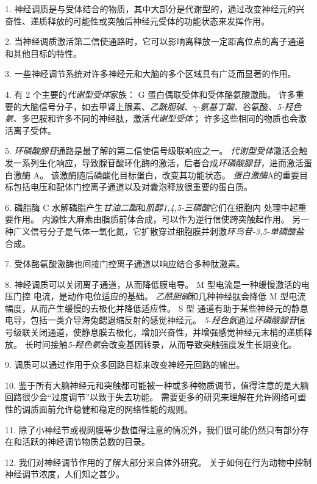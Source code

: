 1. 神经调质是与受体结合的物质，其中大部分是代谢型的，通过改变神经元的兴奋性、递质释放的可能性或突触后神经元受体的功能状态来发挥作用。


2. 当神经调质激活第二信使通路时，它可以影响离释放一定距离位点的离子通道和其他目标的特性。


3. 一些神经调节系统对许多神经元和大脑的多个区域具有广泛而显著的作用。


4. 有 2 个主要的\textit{代谢型受体}家族：
G 蛋白偶联受体和受体酪氨酸激酶。 
许多重要的大脑信号分子，如去甲肾上腺素、\textit{乙酰胆碱}、\textit{$\gamma$-氨基丁酸}、谷氨酸、\textit{5-羟色氨}、多巴胺和许多不同的神经肽，激活\textit{代谢型受体}；
许多这些相同的物质也会激活离子受体。 


5. \textit{环磷酸腺苷}通路是最了解的第二信使信号级联响应之一。
\textit{代谢型受体}激活会触发一系列生化响应，导致腺苷酸环化酶的激活，后者合成\textit{环磷酸腺苷}，进而激活蛋白激酶 A。
该激酶随后磷酸化目标蛋白，改变其功能状态。
\textit{蛋白激酶}A的重要目标包括电压和配体门控离子通道以及对囊泡释放很重要的蛋白质。 


6. 磷脂酶 C 水解磷脂产生\textit{甘油二酯}和\textit{肌醇1,4,5-三磷酸}它们在细胞内  处理中起重要作用。
内源性大麻素由脂质前体合成，可以作为逆行信使跨突触起作用。
另一种广义信号分子是气体一氧化氮，它扩散穿过细胞膜并刺激\textit{环鸟苷-3,5-单磷酸盐}合成。


7. 受体酪氨酸激酶也间接门控离子通道以响应结合多种肽激素。 


8. 神经调质可以关闭离子通道，从而降低膜电导。
M 型电流是一种缓慢激活的电压门控  电流，是动作电位适应的基础。
\textit{乙酰胆碱}和几种神经肽会降低 M 型电流幅度，从而产生缓慢的去极化并降低适应性。
S 型  通道有助于某些神经元的静息  电导，包括一类介导海兔鳃退缩反射的感觉神经元。
\textit{5-羟色氨}通过\textit{环磷酸腺苷}信号级联关闭通道，使静息膜去极化，增加兴奋性，并增强感觉神经元末梢的递质释放。
长时间接触\textit{5-羟色氨}会改变基因转录，从而导致突触强度发生长期变化。 


9. 调质可以通过作用于众多回路目标来改变神经元回路的输出。 


10. 鉴于所有大脑神经元和突触都可能被一种或多种物质调节，值得注意的是大脑回路很少会“过度调节”以致于失去功能。
需要更多的研究来理解在允许网络可塑性的调质面前允许稳健和稳定的网络性能的规则。


11. 除了小神经节或视网膜等少数值得注意的情况外，我们很可能仍然只有部分存在和活跃的神经调节物质总数的目录。


12. 我们对神经调节作用的了解大部分来自体外研究。
关于如何在行为动物中控制神经调节浓度，人们知之甚少。





